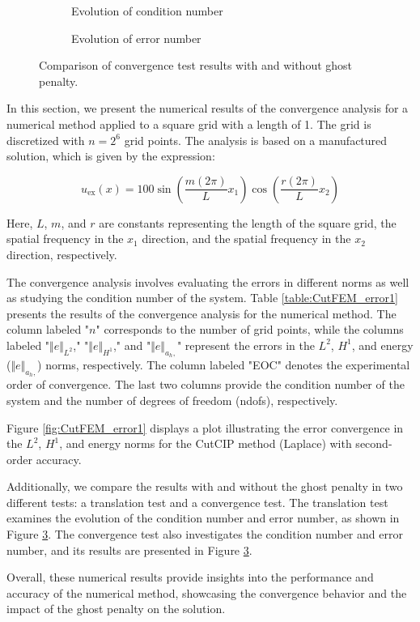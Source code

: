 \begin{figure}[h!]
    \centering
    \begin{subfigure}{0.49\textwidth}
        \centering
        
        \caption{Evolution of condition number}
        \label{subfig:cond}
    \end{subfigure}
    \hfill
    \begin{subfigure}{0.49\textwidth}
        \centering
        
        \caption{Evolution of error number}
        \label{subfig:error}
    \end{subfigure}
    \caption{Comparison of convergence test results with and without ghost penalty.}
    \label{fig:combined}
\end{figure}

In this section, we present the numerical results of the convergence analysis for a numerical method applied to a square grid with a length of 1. The grid is discretized with $n=2^6$ grid points. The analysis is based on a manufactured solution, which is given by the expression:

\[
u_{\text{ex}}(x) = 100 \sin\left(\frac{m(2\pi)}{L}x_1\right)\cos\left(\frac{r(2\pi)}{L}x_2\right)
\]

Here, $L$, $m$, and $r$ are constants representing the length of the square grid, the spatial frequency in the $x_1$ direction, and the spatial frequency in the $x_2$ direction, respectively.

The convergence analysis involves evaluating the errors in different norms as well as studying the condition number of the system. Table \ref{table:CutFEM_error1} presents the results of the convergence analysis for the numerical method. The column labeled "$n$" corresponds to the number of grid points, while the columns labeled "$\Vert e \Vert_{L^2}$," "$\Vert e \Vert_{H^1}$," and "$\Vert e \Vert_{a_h,}$" represent the errors in the $L^2$, $H^1$, and energy ($\Vert e \Vert_{a_h,}$) norms, respectively. The column labeled "EOC" denotes the experimental order of convergence. The last two columns provide the condition number of the system and the number of degrees of freedom (ndofs), respectively.

Figure \ref{fig:CutFEM_error1} displays a plot illustrating the error convergence in the $L^2$, $H^1$, and energy norms for the CutCIP method (Laplace) with second-order accuracy.

Additionally, we compare the results with and without the ghost penalty in two different tests: a translation test and a convergence test. The translation test examines the evolution of the condition number and error number, as shown in Figure \ref{fig:combined}. The convergence test also investigates the condition number and error number, and its results are presented in Figure \ref{fig:combined}.

Overall, these numerical results provide insights into the performance and accuracy of the numerical method, showcasing the convergence behavior and the impact of the ghost penalty on the solution.
